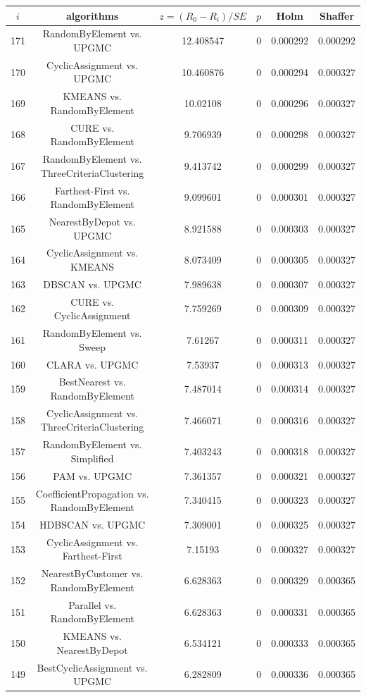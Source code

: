 \documentclass[a4paper,10pt]{article}
\begin{document}
\begin{landscape}
\begin{table}[!htp]
\centering\scriptsize
\begin{tabular}{cccccc}
$i$&algorithms&$z=(R_0 - R_i)/SE$&$p$&Holm&Shaffer\\
\hline171&RandomByElement vs. UPGMC&12.408547&0&0.000292&0.000292\\
170&CyclicAssignment vs. UPGMC&10.460876&0&0.000294&0.000327\\
169&KMEANS vs. RandomByElement&10.02108&0&0.000296&0.000327\\
168&CURE vs. RandomByElement&9.706939&0&0.000298&0.000327\\
167&RandomByElement vs. ThreeCriteriaClustering&9.413742&0&0.000299&0.000327\\
166&Farthest-First vs. RandomByElement&9.099601&0&0.000301&0.000327\\
165&NearestByDepot vs. UPGMC&8.921588&0&0.000303&0.000327\\
164&CyclicAssignment vs. KMEANS&8.073409&0&0.000305&0.000327\\
163&DBSCAN vs. UPGMC&7.989638&0&0.000307&0.000327\\
162&CURE vs. CyclicAssignment&7.759269&0&0.000309&0.000327\\
161&RandomByElement vs. Sweep&7.61267&0&0.000311&0.000327\\
160&CLARA vs. UPGMC&7.53937&0&0.000313&0.000327\\
159&BestNearest vs. RandomByElement&7.487014&0&0.000314&0.000327\\
158&CyclicAssignment vs. ThreeCriteriaClustering&7.466071&0&0.000316&0.000327\\
157&RandomByElement vs. Simplified&7.403243&0&0.000318&0.000327\\
156&PAM vs. UPGMC&7.361357&0&0.000321&0.000327\\
155&CoefficientPropagation vs. RandomByElement&7.340415&0&0.000323&0.000327\\
154&HDBSCAN vs. UPGMC&7.309001&0&0.000325&0.000327\\
153&CyclicAssignment vs. Farthest-First&7.15193&0&0.000327&0.000327\\
152&NearestByCustomer vs. RandomByElement&6.628363&0&0.000329&0.000365\\
151&Parallel vs. RandomByElement&6.628363&0&0.000331&0.000365\\
150&KMEANS vs. NearestByDepot&6.534121&0&0.000333&0.000365\\
149&BestCyclicAssignment vs. UPGMC&6.282809&0&0.000336&0.000365\\

\end{tabular}
\end{table}
\end{landscape}
\end{document}

